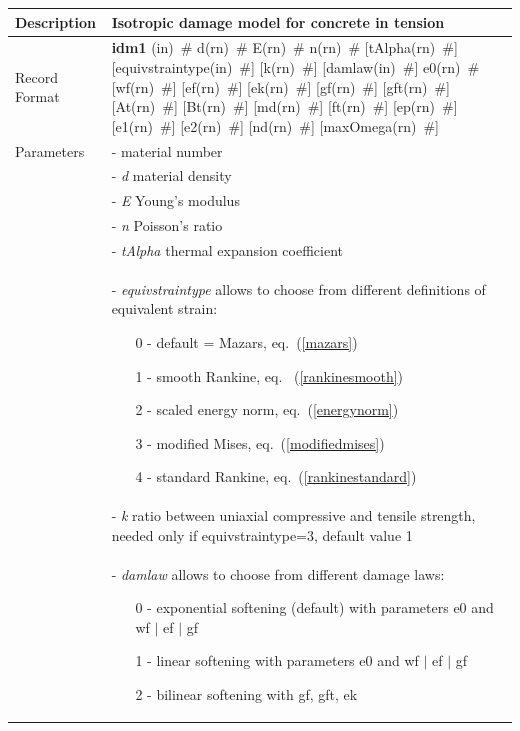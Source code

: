 \documentclass[a4paper]{article}
\newcommand{\descitem}[1]{{\noindent \bf #1}}
\newcommand{\elemparam}[2]{{{#1\tiny (#2)}~\#}}
\newcommand{\param}[1]{{\it #1}}
\begin{document}
\begin{table}[!htb]
  \small
\begin{tabular}{|l|p{9cm}|}
\hline
Description & Isotropic damage model for concrete in tension\\
\hline
Record Format & \descitem{idm1} 
\elemparam{}{in} 
\elemparam{d}{rn} 
\elemparam{E}{rn}
\elemparam{n}{rn} 
[\elemparam{tAlpha}{rn}] 
[\elemparam{equivstraintype}{in}] 
[\elemparam{k}{rn}]
[\elemparam{damlaw}{in}] 
\elemparam{e0}{rn}
[\elemparam{wf}{rn}] 
[\elemparam{ef}{rn}]
[\elemparam{ek}{rn}]
[\elemparam{gf}{rn}]
[\elemparam{gft}{rn}]
[\elemparam{At}{rn}] 
[\elemparam{Bt}{rn}] 
[\elemparam{md}{rn}] 
[\elemparam{ft}{rn}] 
[\elemparam{ep}{rn}] 
[\elemparam{e1}{rn}] 
[\elemparam{e2}{rn}] 
[\elemparam{nd}{rn}] 
[\elemparam{maxOmega}{rn}]\\
Parameters &- \param{} material number\\
&- \param{d} material density\\
&- \param{E} Young's modulus\\
&- \param{n} Poisson's ratio\\
&- \param{tAlpha} thermal expansion coefficient\\
&- \param{equivstraintype} allows to choose from different definitions
of equivalent strain:
\begin{itemize}\setlength{\itemsep}{-3pt}
\item[0 -] default = Mazars, eq.~(\ref{mazars})
\item[1 -] smooth Rankine, eq.~ (\ref{rankinesmooth})
\item[2 -] scaled energy norm,  eq.~(\ref{energynorm})
\item[3 -] modified Mises, eq.~(\ref{modifiedmises})
\item[4 -] standard Rankine, eq.~(\ref{rankinestandard})
\end{itemize}\\
&- \param{k} ratio between uniaxial compressive and tensile strength, needed only if equivstraintype=3, default value 1\\
&- \param{damlaw} allows to choose from different damage laws:
\begin{itemize}\setlength{\itemsep}{-3pt}
\item[0 -] exponential softening (default) with parameters e0 and wf $\vert$ ef $\vert$ gf
\item[1 -] linear softening with parameters e0 and wf $\vert$ ef $\vert$ gf
\item[2 -] bilinear softening with gf, gft, ek

\end{itemize}
\end{tabular}
\end{table}
\end{document}
